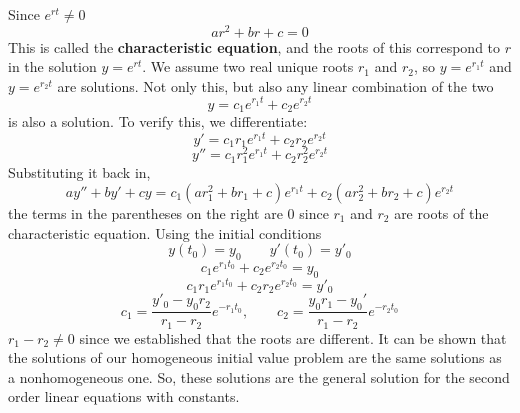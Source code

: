     Since $e^{rt} \neq 0$
    \begin{equation*}
        ar^2 + br + c = 0
    \end{equation*}
    This is called the \textbf{characteristic equation}, and the roots of this correspond to $r$ in the solution $y = e^{rt}$. We assume two real unique roots $r_1$ and $r_2$, so $y = e^{r_1t}$ and $y = e^{r_2t}$ are solutions. Not only this, but also any linear combination of the two
    \begin{equation*}
        y = c_1e^{r_1t} + c_2e^{r_2t}
    \end{equation*}
    is also a solution. To verify this, we differentiate:
    \begin{equation*}
        y' = c_1r_1e^{r_1t} + c_2r_2e^{r_2t}
    \end{equation*}
    \begin{equation*}
        y'' = c_1r_1^2e^{r_1t} + c_2r_2^2e^{r_2t}
    \end{equation*}
    Substituting it back in,
    \begin{equation*}
        ay'' + by' + cy = c_1(ar_1^2 + br_1 + c)e^{r_1t} + c_2(ar_2^2 + br_2 + c)e^{r_2t}
    \end{equation*}
    the terms in the parentheses on the right are 0 since $r_1$ and $r_2$ are roots of the characteristic equation. 
    \newline \indent  
    Using the initial conditions
    \begin{equation*}
        y(t_0) = y_0 \qquad y'(t_0) = y'_0
    \end{equation*}
    \begin{equation*}
        c_1e^{r_1t_0} + c_2e^{r_2t_0} = y_0
    \end{equation*}
    \begin{equation*}
        c_1r_1e^{r_1t_0} + c_2r_2e^{r_2t_0} = y'_0
    \end{equation*}
    \begin{equation*}
        c_1 = \frac{y'_0 - y_0r_2}{r_1 - r_2}e^{-r_1t_0}, \qquad c_2 = \frac{y_0r_1 - y_0'}{r_1 - r_2}e^{-r_2t_0}
    \end{equation*}
    $r_1 - r_2 \neq 0$ since we established that the roots are different.
    \newline \indent
    It can be shown that the solutions of our homogeneous initial value problem are the same solutions as a nonhomogeneous one. So, these solutions are the general solution for the second order linear equations with constants.
    